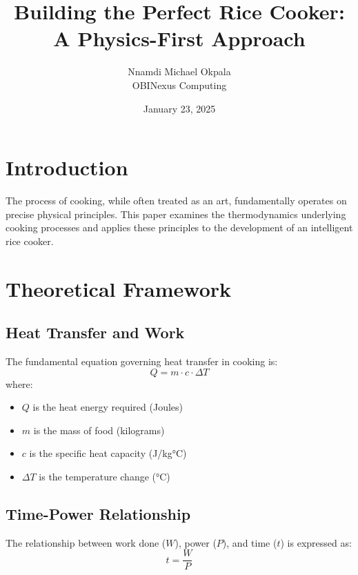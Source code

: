 \documentclass[12pt]{article}
\title{Building the Perfect Rice Cooker: A Physics-First Approach}
\author{Nnamdi Michael Okpala\\OBINexus Computing}
\date{January 23, 2025}
\begin{document}
\maketitle


\section{Introduction}
The process of cooking, while often treated as an art, fundamentally operates on precise physical principles. This paper examines the thermodynamics underlying cooking processes and applies these principles to the development of an intelligent rice cooker.

\section{Theoretical Framework}
\subsection{Heat Transfer and Work}
The fundamental equation governing heat transfer in cooking is:
\begin{equation}
Q = m \cdot c \cdot \Delta T
\end{equation}
where:
\begin{itemize}
    \item $Q$ is the heat energy required (Joules)
    \item $m$ is the mass of food (kilograms)
    \item $c$ is the specific heat capacity (J/kg°C)
    \item $\Delta T$ is the temperature change (°C)
\end{itemize}

\subsection{Time-Power Relationship}
The relationship between work done ($W$), power ($P$), and time ($t$) is expressed as:
\begin{equation}
t = \frac{W}{P}
\end{equation}
\end{document}

